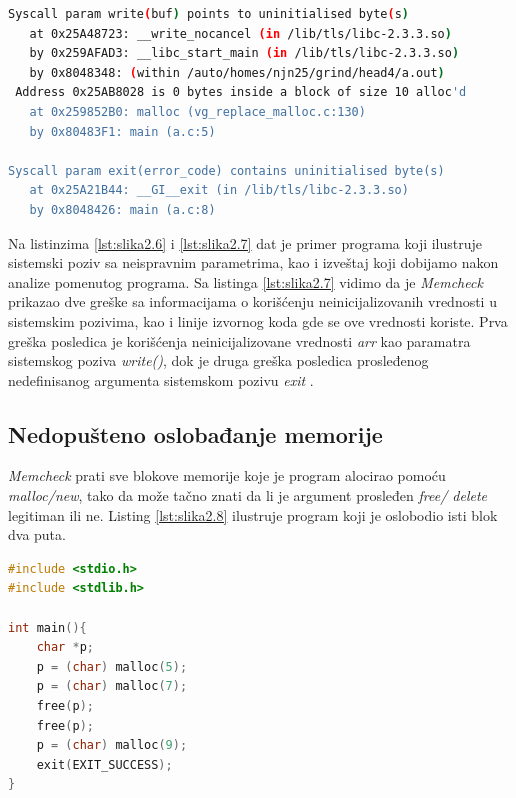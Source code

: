 \documentclass[12pt,oneside]{memoir}
\theoremstyle{plain}
\theoremstyle{definition}
\begin{document}

\begin{lstlisting}[style=terminal,caption={Primer ispisa greške korišćenja neinicializovane ili neadresirane vrednosti u sistemskom pozivu}, label={lst:slika2.7},language={bash}] 
Syscall param write(buf) points to uninitialised byte(s)
   at 0x25A48723: __write_nocancel (in /lib/tls/libc-2.3.3.so)
   by 0x259AFAD3: __libc_start_main (in /lib/tls/libc-2.3.3.so)
   by 0x8048348: (within /auto/homes/njn25/grind/head4/a.out)
 Address 0x25AB8028 is 0 bytes inside a block of size 10 alloc'd
   at 0x259852B0: malloc (vg_replace_malloc.c:130)
   by 0x80483F1: main (a.c:5)

Syscall param exit(error_code) contains uninitialised byte(s)
   at 0x25A21B44: __GI__exit (in /lib/tls/libc-2.3.3.so)
   by 0x8048426: main (a.c:8)
\end{lstlisting}

Na listinzima \ref{lst:slika2.6} i \ref{lst:slika2.7} dat je primer programa koji ilustruje sistemski poziv sa neispravnim parametrima, kao i izveštaj koji dobijamo nakon analize pomenutog programa. Sa listinga \ref{lst:slika2.7} vidimo da je \textit{Memcheck} prikazao dve greške sa informacijama o korišćenju neinicijalizovanih vrednosti u sistemskim pozivima, kao i linije izvornog koda gde se ove vrednosti koriste. Prva greška posledica je korišćenja neinicijalizovane vrednosti \textit{arr} kao paramatra sistemskog poziva \textit{write()}, dok je druga greška posledica prosleđenog nedefinisanog argumenta sistemskom pozivu \textit{exit} \cite{Memcheck}. 

\subsection{Nedopušteno oslobađanje memorije}
\textit{Memcheck} prati sve blokove memorije koje je program alocirao pomoću \textit{malloc/new}, tako da može tačno znati da li je argument prosleđen \textit{free/ delete} legitiman ili ne. Listing \ref{lst:slika2.8} ilustruje program koji je oslobodio isti blok dva puta. 

\begin{lstlisting}[style=mystyle,caption={Program koji oslobađa isti blok dva puta}, label={lst:slika2.8},language={C}] 
#include <stdio.h>
#include <stdlib.h>

int main(){
	char *p;
	p = (char) malloc(5);
	p = (char) malloc(7);
	free(p);
	free(p);
	p = (char) malloc(9);
	exit(EXIT_SUCCESS);
}
\end{lstlisting}
\end{document}
